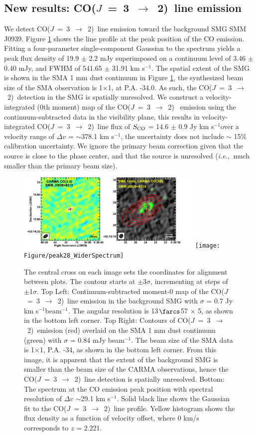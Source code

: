 \documentclass{emulateapj}
\newcommand{\CO}{\mbox{CO($J$ = 3 $\rightarrow$ 2) }}
\newcommand{\ie}{{\sl i.e.,~}}
\newcommand{\pmOne}{$^{-1}$}
\begin{document}
\subsection{New results: \CO line emission}
We detect \CO line emission toward the background SMG SMM J0939. Figure \ref{fig:mom0} shows the line profile at the peak position of the CO emission. Fitting a four-parameter single-component Gaussian to the spectrum yields a peak flux density of 19.9 $\pm
$ 2.2 mJy superimposed on a continuum level of 3.46 $\pm$ 0.40 mJy, and FWHM of 541.65 $\pm$ 31.91 km s\pmOne. 
The spatial extent of the SMG is shown in the SMA 1 mm dust continuum in Figure \ref{fig:mom0}, the 
synthesized beam size of the SMA observation is 1$ \times $1, at P.A. -34.0\degr. As such, the \CO detection in the SMG is spatially unresolved. We construct a velocity-integrated (0th moment) map of the \CO 
emission using the continuum-subtracted data in the visibility plane, this results in velocity-integrated \CO line flux of $S_{\rm CO}$ = 14.6 $\pm$ 0.9 Jy km s\pmOne over a velocity range of $\Delta v$ = $\sim$378.1 km s\pmOne, the uncertainty does not include $\sim$ 15\% calibration uncertainty. We ignore the primary beam correction given that the source is close to the phase center, and that the source is unresolved (\ie much smaller than the primary beam size).

\begin{figure}[tbph] 
\centering
\includegraphics[width=0.8\textwidth]{Figure/LinePanel}
\texttt{[image: Figure/peak28\_WiderSpectrum]}
\caption{The central cross on each image sets the coordinates for alignment between plots. The contour starts at $\pm$3$\sigma$, 
incrementing at
steps of $\pm$1$\sigma$. Top Left: Continuum-subtracted moment-0 map of the \CO line emission in 
the background SMG with $\sigma$ = 0.7 Jy km s\pmOne beam\pmOne. The angular resolution is 13$\farcs$57 $\times$ 
5, as shown in the bottom left corner. 
Top Right: Contours of \CO emission (red) overlaid on the SMA 1 mm dust continuum (green) with $
\sigma$ = 0.84 mJy beam\pmOne. The beam size of the SMA data is 1$ \times $1, P.A. -34\degr, as shown 
in the bottom left corner. From this image, it is apparent that the extent of the background SMG is smaller than the beam 
size of the CARMA observations, hence the \CO line detection is spatially unresolved. Bottom: 
The spectrum at the CO emission peak position with spectral resolution of $\Delta v$ $\sim$29.1 km s\pmOne.
Solid black line shows the Gaussian fit to the \CO line profile. Yellow histogram shows the 
flux density as a function of velocity offset, where 0 km/s corresponds to $z$ = 2.221. \label{fig:mom0}}
\end{figure}
\end{document}
